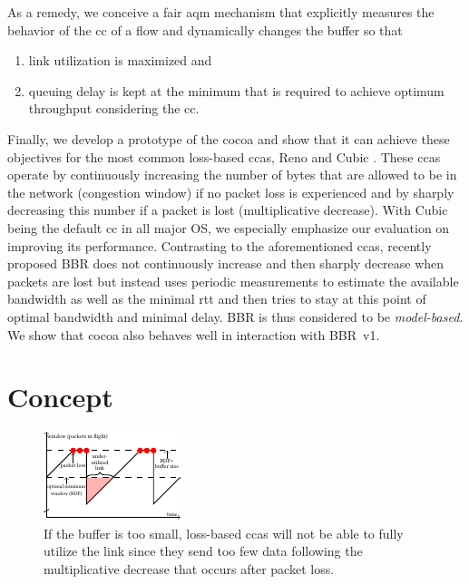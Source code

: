 \documentclass[10pt,sigconf,letterpaper,dvipsnames\ifx\removeHeaders\tempYes ,nonacm\fi]{acmart}
\begin{document}
As a remedy, we conceive a fair \gls{aqm} mechanism that explicitly measures the behavior of the \gls{cc} of a flow and dynamically changes the buffer so that 
\begin{enumerate}[topsep=0pt,wide,labelwidth=!,labelindent=0pt]
\item link utilization is maximized and
\item queuing delay is kept at the minimum that is required to achieve optimum throughput considering the \gls{cc}.
\end{enumerate}
Finally, we develop a prototype of the \gls{cocoa} and show that it can achieve these objectives for the most common loss-based \glspl{cca}, Reno \cite {jacobson_congestion_1988} and Cubic \cite{ha_cubic:_2008}. These \glspl{cca} operate by continuously increasing the number of bytes that are allowed to be in the network (congestion window) if no packet loss is experienced and by sharply decreasing this number if a packet is lost (multiplicative decrease). With Cubic being the default \gls{cc} in all major OS, we especially emphasize our evaluation on improving its performance. Contrasting to the aforementioned \glspl{cca}, recently proposed BBR \cite{cardwell_bbr:_2016} does not continuously increase and then sharply decrease when packets are lost but instead uses periodic measurements to estimate the available bandwidth as well as the minimal \gls{rtt} and then tries to stay at this point of optimal bandwidth and minimal delay. BBR is thus considered to be \textit{model-based}. We show that \gls{cocoa} also behaves well in interaction with BBR~v1.

\section{Concept}

\begin{figure}[h]
\includegraphics[width=\columnwidth]{figures/cocoa_illustration_too_little.pdf}
\caption{If the buffer is too small, loss-based \glspl{cca} will not be able to fully utilize the link since they send too few data following the multiplicative decrease that occurs after packet loss.}
\label{fig:tooLittle}
\end{figure}
\end{document}
